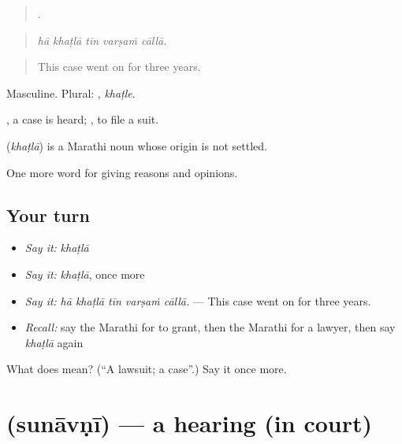 \begin{quote}
    .
\end{quote}

\begin{quote}
\emph{hā khaṭlā tīn varṣaṁ cāllā.}
\end{quote}

\begin{quote}
This case went on for three years.
\end{quote}

Masculine. Plural: , \emph{khaṭle}.

 , a case is heard;  , to file a suit.

\begin{cousinweb}
\textbf{} (\emph{khaṭlā}) is a Marathi noun whose origin is not settled.
\end{cousinweb}

\begin{grammarlens}[title={What you've built}]
One more word for giving reasons and opinions.
\end{grammarlens}

\subsection*{Your turn}
\begin{itemize}
\raggedright
  \item \emph{Say it:} \emph{khaṭlā}
  \item \emph{Say it:} \emph{khaṭlā}, once more
  \item \emph{Say it:} \emph{hā khaṭlā tīn varṣaṁ cāllā.} — This case went on for three years.
  \item \emph{Recall:} say the Marathi for to grant, then the Marathi for a lawyer, then say \emph{khaṭlā} again
\end{itemize}

\begin{tcolorbox}[breakable,colback=teal!4,colframe=teal!35!black,title={Before you move on}]
What does  mean? (\textquotedblleft{}A lawsuit; a case\textquotedblright{}.) Say it once more.
\end{tcolorbox}
\section[\texorpdfstring{\mr{सुनावणी} (sunāvṇī)}{सुनावणी (sunāvṇī)}]{ (sunāvṇī) — a hearing (in court)}

